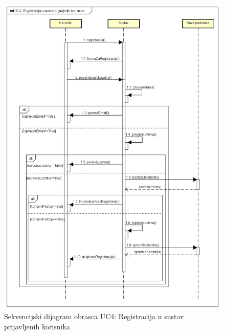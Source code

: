 				\begin{figure}[H]
					\includegraphics[width=\textwidth]{slike/uc4Sekvencijski.PNG} %
					\caption{Sekvencijski dijagram obrasca UC4: Registracija u sustav prijavljenih korisnika}
					\label{fig:uc4-sekvencijski} %
				\end{figure}
				\eject

